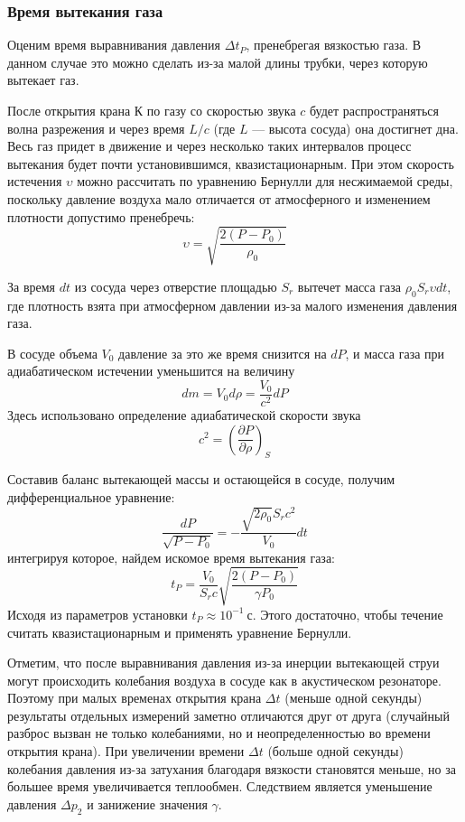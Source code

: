 \documentclass[a4paper,12pt]{article}
\theoremstyle{plain} %
\theoremstyle{definition} %
\theoremstyle{remark} %
\begin{document}
\subsubsection{Время вытекания газа}
Оценим время выравнивания давления $\Delta t_P$, пренебрегая вязкостью газа. В данном случае это можно сделать из-за малой длины трубки, через которую вытекает газ.

После открытия крана $\text{К}$ по газу со скоростью звука $c$ будет распространяться волна разрежения и через время $L/c$ (где $L$ — высота сосуда) она достигнет дна. Весь газ придет в движение и через несколько таких интервалов процесс вытекания будет почти установившимся, квазистационарным. При этом скорость истечения $\upsilon$ можно рассчитать по уравнению Бернулли для несжимаемой среды, поскольку давление воздуха мало отличается от атмосферного и изменением плотности допустимо пренебречь:
\[ \upsilon = \sqrt{\frac{2(P - P_0)}{\rho_0}}\]

За время $dt$ из сосуда через отверстие площадью $S_r$ вытечет масса газа $\rho_0 S_r \upsilon dt$, где плотность взята при атмосферном давлении из-за малого изменения давления газа.

В сосуде объема $V_0$ давление за это же время снизится на $dP$, и масса газа при адиабатическом истечении уменьшится на величину
\[dm = V_0 d\rho = \frac{V_0}{c^2}dP\]
Здесь использовано определение адиабатической скорости звука
\[c^2 = \left(\frac{\partial P}{\partial \rho} \right)_S \]

Составив баланс вытекающей массы и остающейся в сосуде, получим дифференциальное уравнение:
\[ \frac{dP}{\sqrt{P - P_0}} = -\frac{\sqrt{2\rho_0}S_r c^2}{V_0}dt \]
интегрируя которое, найдем искомое время вытекания газа:
\[t_P = \frac{V_0}{S_r c}\sqrt{\frac{2(P - P_0)}{\gamma P_0}}\]
Исходя из параметров установки $t_P \approx 10^{-1}\ \text{с}$. Этого достаточно, чтобы течение считать квазистационарным и применять уравнение Бернулли.

Отметим, что после выравнивания давления из-за инерции вытекающей струи могут происходить колебания воздуха в сосуде как в акустическом резонаторе. Поэтому при малых временах открытия крана $\Delta t$ (меньше одной секунды) результаты отдельных измерений заметно отличаются друг от друга (случайный разброс вызван не только колебаниями, но и неопределенностью во времени открытия крана). При увеличении времени $\Delta t$ (больше одной секунды) колебания давления из-за затухания благодаря вязкости становятся меньше, но за большее время увеличивается теплообмен. Следствием является уменьшение давления $\Delta p_2$ и занижение значения $\gamma$.
\end{document}
